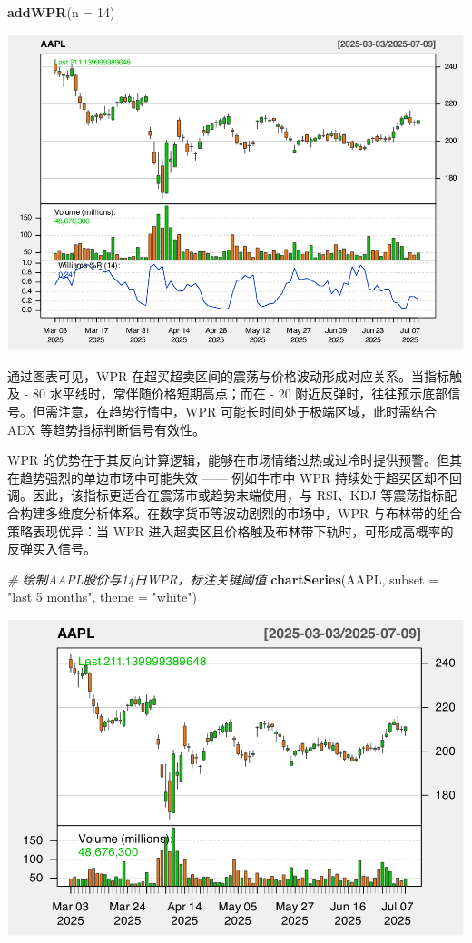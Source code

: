 \documentclass[]{ctexbook}
\newenvironment{Shaded}{\begin{snugshade}}{\end{snugshade}}
\newcommand{\AttributeTok}[1]{\textcolor[rgb]{0.13,0.29,0.53}{#1}}
\newcommand{\CommentTok}[1]{\textcolor[rgb]{0.56,0.35,0.01}{\textit{#1}}}
\newcommand{\DecValTok}[1]{\textcolor[rgb]{0.00,0.00,0.81}{#1}}
\newcommand{\FunctionTok}[1]{\textcolor[rgb]{0.13,0.29,0.53}{\textbf{#1}}}
\newcommand{\NormalTok}[1]{#1}
\newcommand{\StringTok}[1]{\textcolor[rgb]{0.31,0.60,0.02}{#1}}
\begin{document}
\begin{Shaded}
\begin{Highlighting}[]
\FunctionTok{addWPR}\NormalTok{(}\AttributeTok{n =} \DecValTok{14}\NormalTok{)}
\end{Highlighting}
\end{Shaded}

\includegraphics[width=0.9\linewidth]{quantmod_files/figure-latex/wpr-2}

通过图表可见，WPR 在超买超卖区间的震荡与价格波动形成对应关系。当指标触及 - 80 水平线时，常伴随价格短期高点；而在 - 20 附近反弹时，往往预示底部信号。但需注意，在趋势行情中，WPR 可能长时间处于极端区域，此时需结合 ADX 等趋势指标判断信号有效性。

WPR 的优势在于其反向计算逻辑，能够在市场情绪过热或过冷时提供预警。但其在趋势强烈的单边市场中可能失效 ------ 例如牛市中 WPR 持续处于超买区却不回调。因此，该指标更适合在震荡市或趋势末端使用，与 RSI、KDJ 等震荡指标配合构建多维度分析体系。在数字货币等波动剧烈的市场中，WPR 与布林带的组合策略表现优异：当 WPR 进入超卖区且价格触及布林带下轨时，可形成高概率的反弹买入信号。

\begin{Shaded}
\begin{Highlighting}[]
\CommentTok{\# 绘制AAPL股价与14日WPR，标注关键阈值}
\FunctionTok{chartSeries}\NormalTok{(AAPL, }\AttributeTok{subset =} \StringTok{"last 5 months"}\NormalTok{, }\AttributeTok{theme =} \StringTok{"white"}\NormalTok{)}
\end{Highlighting}
\end{Shaded}

\includegraphics[width=0.9\linewidth]{quantmod_files/figure-latex/wpr_2-1}
\end{document}
